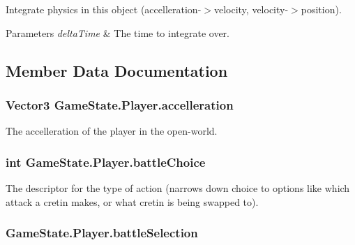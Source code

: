 Integrate physics in this object (accelleration-\/$>$velocity, velocity-\/$>$position). 


\begin{DoxyParams}{Parameters}
{\em delta\-Time} & The time to integrate over.\\
\hline
\end{DoxyParams}


\subsection{Member Data Documentation}
\hypertarget{class_game_state_1_1_player_a8f25769e000454ef477d359f44a5ed31}{
\subsubsection[{accelleration}]{\setlength{\rightskip}{0pt plus 5cm}Vector3 Game\-State.\-Player.\-accelleration}}\label{class_game_state_1_1_player_a8f25769e000454ef477d359f44a5ed31}


The accelleration of the player in the open-\/world. 

\hypertarget{class_game_state_1_1_player_a3bfa8ea6e2067982474dc4f6073061c5}{
\subsubsection[{battle\-Choice}]{\setlength{\rightskip}{0pt plus 5cm}int Game\-State.\-Player.\-battle\-Choice}}\label{class_game_state_1_1_player_a3bfa8ea6e2067982474dc4f6073061c5}


The descriptor for the type of action (narrows down choice to options like which attack a cretin makes, or what cretin is being swapped to). 

\hypertarget{class_game_state_1_1_player_a123c8ee2ef6e66e88bcca1a80f73ab4a}{
\subsubsection[{battle\-Selection}]{ Game\-State.\-Player.\-battle\-Selection}}\label{class_game_state_1_1_player_a123c8ee2ef6e66e88bcca1a80f73ab4a}



